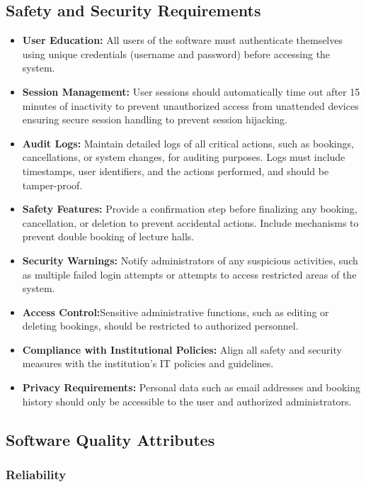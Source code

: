 \documentclass[a4paper,12pt]{article}
\begin{document}
\subsection{Safety and Security Requirements} \label{subsec:security_reqs}
\begin{itemize}
    \item \textbf{User Education:} All users of the software must authenticate themselves using unique credentials (username and password) before accessing the system.
    \item \textbf{Session Management:} User sessions should automatically time out after 15 minutes of inactivity to prevent unauthorized access from unattended devices ensuring secure session handling to prevent session hijacking.
    \item \textbf{Audit Logs:} Maintain detailed logs of all critical actions, such as bookings, cancellations, or system changes, for auditing purposes. Logs must include timestamps, user identifiers, and the actions performed, and should be tamper-proof.
    \item \textbf{Safety Features:} Provide a confirmation step before finalizing any booking, cancellation, or deletion to prevent accidental actions. Include mechanisms to prevent double booking of lecture halls.
    \item \textbf{Security Warnings:} Notify administrators of any suspicious activities, such as multiple failed login attempts or attempts to access restricted areas of the system.
    \item \textbf{Access Control:}Sensitive administrative functions, such as editing or deleting bookings, should be restricted to authorized personnel.
    \item \textbf{Compliance with Institutional Policies:}  Align all safety and security measures with the institution’s IT policies and guidelines.
    \item \textbf{Privacy Requirements:} Personal data such as email addresses and booking history should only be accessible to the user and authorized administrators.

\end{itemize}

\subsection{Software Quality Attributes} \label{subsec:software_quality_reqs}

\subsubsection{Reliability}
\end{document}
